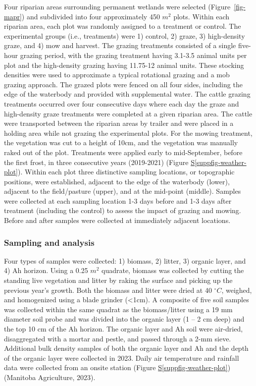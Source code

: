 \documentclass[
]{agujournal2019}
\newcommand*\quartosuppfigref[1]{Figure \hyperref[#1]{S\ref{#1}}}
\begin{document}
Four riparian areas surrounding permanent wetlands were selected
(Figure~\ref{fig-mapr}) and subdivided into four approximately 450
\(m^2\) plots. Within each riparian area, each plot was randomly
assigned to a treatment or control. The experimental groups (i.e.,
treatments) were 1) control, 2) graze, 3) high-density graze, and 4) mow
and harvest. The grazing treatments consisted of a single five-hour
grazing period, with the grazing treatment having 3.1-3.5 animal units
per plot and the high-density grazing having 11.75-12 animal units.
These stocking densities were used to approximate a typical rotational
grazing and a mob grazing approach. The grazed plots were fenced on all
four sides, including the edge of the waterbody and provided with
supplemental water. The cattle grazing treatments occurred over four
consecutive days where each day the graze and high-density graze
treatments were completed at a given riparian area. The cattle were
transported between the riparian areas by trailer and were placed in a
holding area while not grazing the experimental plots. For the mowing
treatment, the vegetation was cut to a height of 10cm, and the
vegetation was manually raked out of the plot. Treatments were applied
early to mid-September, before the first frost, in three consecutive
years (2019-2021) (\quartosuppfigref{suppfig-weather-plot}). Within each
plot three distinctive sampling locations, or topographic positions,
were established, adjacent to the edge of the waterbody (lower),
adjacent to the field/pasture (upper), and at the mid-point (middle).
Samples were collected at each sampling location 1-3 days before and 1-3
days after treatment (including the control) to assess the impact of
grazing and mowing. Before and after samples were collected at
immediately adjacent locations.

\subsubsection{Sampling and analysis}\label{sampling-and-analysis}

Four types of samples were collected: 1) biomass, 2) litter, 3) organic
layer, and 4) Ah horizon. Using a 0.25 \(m^2\) quadrate, biomass was
collected by cutting the standing live vegetation and litter by raking
the surface and picking up the previous year's growth. Both the biomass
and litter were dried at 40 \(^\circ C\), weighed, and homogenized using
a blade grinder (\textless1cm). A composite of five soil samples was
collected within the same quadrat as the biomass/litter using a 19 mm
diameter soil probe and was divided into the organic layer (1 -- 2 cm
deep) and the top 10 cm of the Ah horizon. The organic layer and Ah soil
were air-dried, disaggregated with a mortar and pestle, and passed
through a 2-mm sieve. Additional bulk density samples of both the
organic layer and Ah and the depth of the organic layer were collected
in 2023. Daily air temperature and rainfall data were collected from an
onsite station (\quartosuppfigref{suppfig-weather-plot}) (Manitoba
Agriculture, 2023).
\end{document}
